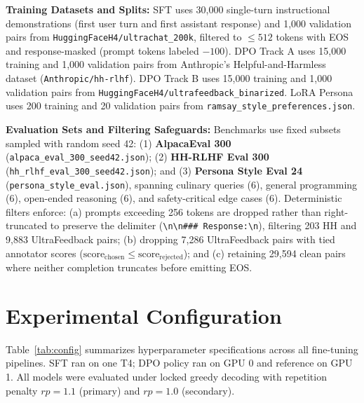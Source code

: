 \documentclass[11pt,a4paper]{article}
\begin{document}
\noindent\textbf{Training Datasets and Splits:} SFT uses 30,000 single-turn instructional demonstrations (first user turn and first assistant response) and 1,000 validation pairs from \texttt{HuggingFaceH4/ultrachat\_200k}, filtered to $\le 512$ tokens with EOS and response-masked (prompt tokens labeled $-100$). DPO Track A uses 15,000 training and 1,000 validation pairs from Anthropic's Helpful-and-Harmless dataset (\texttt{Anthropic/hh-rlhf}). DPO Track B uses 15,000 training and 1,000 validation pairs from \texttt{HuggingFaceH4/ultrafeedback\_binarized}. LoRA Persona uses 200 training and 20 validation pairs from \texttt{ramsay\_style\_preferences.json}.

\noindent\textbf{Evaluation Sets and Filtering Safeguards:} Benchmarks use fixed subsets sampled with random seed 42: (1) \textbf{AlpacaEval 300} (\texttt{alpaca\_eval\_300\_seed42.json}); (2) \textbf{HH-RLHF Eval 300} (\texttt{hh\_rlhf\_eval\_300\_seed42.json}); and (3) \textbf{Persona Style Eval 24} (\texttt{persona\_style\_eval.json}), spanning culinary queries (6), general programming (6), open-ended reasoning (6), and safety-critical edge cases (6). Deterministic filters enforce: (a) prompts exceeding 256 tokens are dropped rather than right-truncated to preserve the delimiter (\texttt{\textbackslash n\textbackslash n\#\#\# Response:\textbackslash n}), filtering 203 HH and 9,883 UltraFeedback pairs; (b) dropping 7,286 UltraFeedback pairs with tied annotator scores ($\text{score}_{\text{chosen}} \le \text{score}_{\text{rejected}}$); and (c) retaining 29,594 clean pairs where neither completion truncates before emitting EOS.

\section{Experimental Configuration}
\label{sec:config}

Table~\ref{tab:config} summarizes hyperparameter specifications across all fine-tuning pipelines. SFT ran on one T4; DPO policy ran on GPU 0 and reference on GPU 1. All models were evaluated under locked greedy decoding with repetition penalty $rp=1.1$ (primary) and $rp=1.0$ (secondary).
\end{document}
